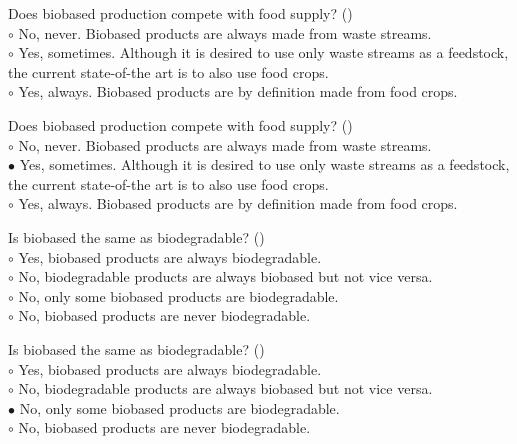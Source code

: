 \documentclass[]{beamer}
\begin{document}
\begin{CJK}{UTF8}{gbsn}
\begin{frame}[shrink] {}
\addtocounter{questions}{1}
\color{blue}
Does biobased production compete with food supply?
({})\\
\color{black}
\setlength{\parindent}{-0.4cm}
{\color{red}$\circ$} No, never. Biobased products are always made from waste streams.  \\
{\color{red}$\circ$}  Yes, sometimes. Although it is desired to use only waste streams as a feedstock, the current state-of-the art is to also use food crops.  \\
{\color{red}$\circ$} Yes, always. Biobased products are by definition made from food crops.  \\
\end{frame}
\begin{frame}[shrink] {}
\addtocounter{answers}{1}
\color{blue}
Does biobased production compete with food supply?
({})\\
\color{black}
\setlength{\parindent}{-0.4cm}
{\color{red}$\circ$} No, never. Biobased products are always made from waste streams.  \\
{\color{red}$\bullet$} Yes, sometimes. Although it is desired to use only waste streams as a feedstock, the current state-of-the art is to also use food crops.  \\
{\color{red}$\circ$} Yes, always. Biobased products are by definition made from food crops.  \\
\end{frame}


\begin{frame}[shrink] {}
\addtocounter{questions}{1}
\color{blue}
Is biobased the same as biodegradable?
({})\\
\color{black}
\setlength{\parindent}{-0.4cm}
{\color{red}$\circ$} Yes, biobased products are always biodegradable.  \\
{\color{red}$\circ$} No, biodegradable products are always biobased but not vice versa.  \\
{\color{red}$\circ$}  No, only some biobased products are biodegradable.  \\
{\color{red}$\circ$} No, biobased products are never biodegradable.  \\
\end{frame}
\begin{frame}[shrink] {}
\addtocounter{answers}{1}
\color{blue}
Is biobased the same as biodegradable?
({})\\
\color{black}
\setlength{\parindent}{-0.4cm}
{\color{red}$\circ$} Yes, biobased products are always biodegradable.  \\
{\color{red}$\circ$} No, biodegradable products are always biobased but not vice versa.  \\
{\color{red}$\bullet$} No, only some biobased products are biodegradable.  \\
{\color{red}$\circ$} No, biobased products are never biodegradable.  \\
\end{frame}



\end{CJK}
\end{document}
